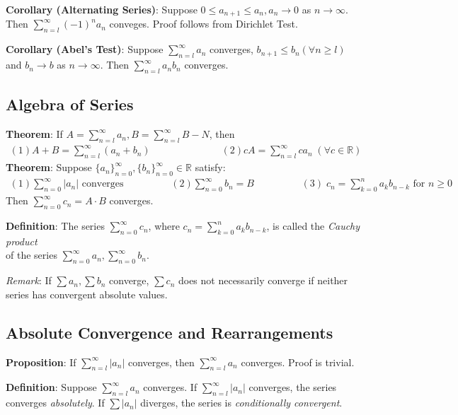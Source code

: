 \documentclass[11pt]{article}
\begin{document}
\textbf{Corollary (Alternating Series)}: Suppose $0 \leq a_{n+1} \leq a_n, a_n \to 0$ as $n \to \infty$. Then $\sum_{n=l}^\infty (-1)^n a_n$ conveges. Proof follows from Dirichlet Test.

\textbf{Corollary (Abel's Test)}: Suppose $\sum_{n=l}^\infty a_n$ converges, $b_{n+1} \leq b_n (\forall n \geq l)$ and $b_n \to b$ as $n \to \infty$. Then $\sum_{n=l}^\infty a_nb_n$ converges.

\subsection{Algebra of Series}

\textbf{Theorem}: If $A = \sum_{n=l}^\infty a_n, B = \sum_{n=l}^\infty B-N$, then
\begin{align*}
(1) A + B = \sum_{n=l}^\infty (a_n + b_n) \hspace{3cm} (2) cA = \sum_{n=l}^\infty ca_n \;(\forall c \in \mathbb{R})
\end{align*}
\textbf{Theorem}: Suppose $\{a_n\}_{n=0}^\infty, \{b_n\}_{n=0}^\infty \in \mathbb{R}$ satisfy:
\begin{align*}
(1) \sum_{n=0}^\infty |a_n| \text{ converges} \hspace{2cm}
(2) \sum_{n=0}^\infty b_n = B \hspace{2cm}
(3)\; c_n = \sum_{k=0}^n a_kb_{n-k}\text{ for }n \geq 0
\end{align*}
Then $\sum_{n=0}^\infty c_n = A \cdot B$ converges.

\textbf{Definition}: The series $\sum\limits_{n=0}^\infty c_n$, where $c_n = \sum\limits_{k=0}^n a_k b_{n-k}$, is called the \emph{Cauchy product}\\ of the series $\sum\limits_{n=0}^\infty a_n, \sum\limits_{n=0}^\infty b_n$.

\emph{Remark}: If $\sum a_n, \sum b_n$ converge, $\sum c_n$ does not necessarily converge if neither series has convergent absolute values.

\subsection{Absolute Convergence and Rearrangements}

\textbf{Proposition}: If $\sum_{n=l}^\infty |a_n|$ converges, then $\sum_{n=l}^\infty a_n$ converges. Proof is trivial.

\textbf{Definition}: Suppose $\sum_{n=l}^\infty a_n$ converges. If $\sum_{n=l}^\infty |a_n|$ converges, the series converges \emph{absolutely}. If $\sum |a_n|$ diverges, the series is \emph{conditionally convergent}.
\end{document}
